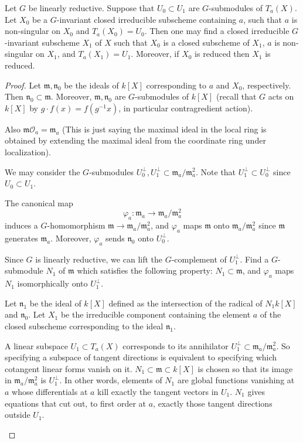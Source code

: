 \documentclass[12pt]{article}
\begin{document}
\begin{theorem}[2.1]
Let $G$ be linearly reductive. Suppose that $U_0 \subset U_1$ are $G$-submodules of $T_a(X)$.  
Let $X_0$ be a $G$-invariant closed irreducible subscheme containing $a$, such that $a$ is non-singular on $X_0$ and $T_a(X_0) = U_0$.  
Then one may find a closed irreducible $G$-invariant subscheme $X_1$ of $X$ such that $X_0$ is a closed subscheme of $X_1$, $a$ is non-singular on $X_1$, and $T_a(X_1) = U_1$.  
Moreover, if $X_0$ is reduced then $X_1$ is reduced.
\end{theorem}

\begin{proof}
Let $\mathfrak{m}, \mathfrak{n}_0$ be the ideals of $k[X]$ corresponding to $a$ and $X_0$, respectively.  
Then $\mathfrak{n}_0 \subset \mathfrak{m}$. Moreover, $\mathfrak{m}, \mathfrak{n}_0$ are $G$-submodules of $k[X]$ (recall that $G$ acts on $k[X]$ by $g\cdot f(x) = f(g^{-1}x)$, in particular contragredient action).

Also $\mathfrak{m}\mathcal{O}_a = \mathfrak{m}_a$ (This is just saying the maximal ideal in the local ring is obtained by extending the maximal ideal from the coordinate ring under localization).

We may consider the $G$-submodules $U_0^\perp, U_1^\perp \subset \mathfrak{m}_a / \mathfrak{m}_a^2$. Note that $U_1^\perp \subset U_0^\perp$ since $U_0 \subset U_1$.

The canonical map
\[
   \varphi_a : \mathfrak{m}_a \longrightarrow \mathfrak{m}_a / \mathfrak{m}_a^2
\]
induces a $G$-homomorphism $\mathfrak{m} \to \mathfrak{m}_a / \mathfrak{m}_a^2$, and $\varphi_a$ maps $\mathfrak{m}$ onto $\mathfrak{m}_a / \mathfrak{m}_a^2$ since $\mathfrak{m}$ generates $\mathfrak{m}_a$.  
Moreover, $\varphi_a$ sends $\mathfrak{n}_0$ onto $U_0^\perp$.  

Since $G$ is linearly reductive, we can lift the $G$-complement of $U_1^\perp$. Find a $G$-submodule $N_1$ of $\mathfrak{m}$ which satisfies the following property: $N_1 \subset \mathfrak{m}$, and $\varphi_a$ maps $N_1$ isomorphically onto $U_1^\perp$.  

Let $\mathfrak{n}_1$ be the ideal of $k[X]$ defined as the intersection of the radical of $N_1k[X]$ and $\mathfrak{n}_0$.  
Let $X_1$ be the irreducible component containing the element $a$ of the closed subscheme corresponding to the ideal $\mathfrak{n}_1$.  
\begin{remark}
A linear subspace $U_1 \subset T_a(X)$ corresponds to its annihilator $U_1^\perp \subset \mathfrak{m}_a/\mathfrak{m}_a^2$. So specifying a subspace of tangent directions is equivalent to specifying which cotangent linear forms vanish on it. $N_1 \subset \mathfrak{m} \subset k[X]$ is chosen so that its image in $\mathfrak{m}_a/\mathfrak{m}_a^2$ is $U_1^\perp$. In other words, elements of $N_1$ are global functions vanishing at $a$ whose differentials at $a$ kill exactly the tangent vectors in $U_1$. $N_1$ gives equations that cut out, to first order at $a$, exactly those tangent directions outside $U_1$.


\end{remark}
\end{proof}
\end{document}
